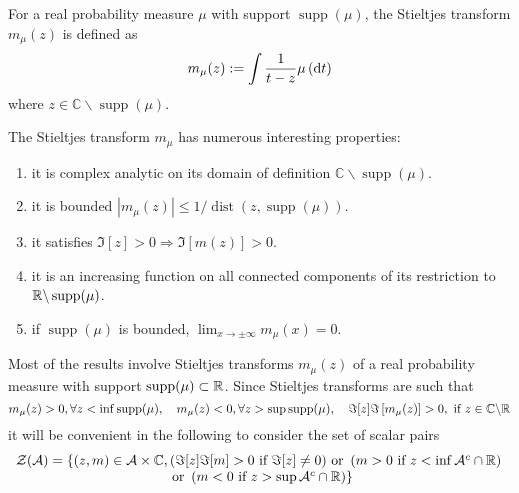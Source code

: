 \begin{definition}
	For a real probability measure \(\mu\) with support \(\operatorname{supp}(\mu)\), the Stieltjes transform \(m_{\mu}(z)\) is defined as
	\begin{equation}
		m_{\mu}(z):=\int\frac{1}{t-z}\mu\left(\mathop{}\!\mathrm{d} t\right)
	\end{equation}
	where \(z\in\mathbb{C}\backslash\operatorname{supp}(\mu)\).
\end{definition}

\begin{property}
	The Stieltjes transform \(m_{\mu}\) has numerous interesting properties:
	\begin{enumerate}
		\item it is complex analytic on its domain of definition \(\mathbb{C} \backslash \operatorname{supp}(\mu)\).
		\item it is bounded \(\left|m_{\mu}(z)\right|\leq 1/\operatorname{dist}(z,\operatorname{supp}(\mu))\).
		\item it satisfies \(\Im[z]>0 \Rightarrow \Im[m(z)]>0\).
		\item it is an increasing function on all connected components of its restriction to \(\mathbb{R}\backslash\operatorname{supp}(\mu)\). %
		\item if \(\operatorname{supp}(\mu)\) is bounded, \(\lim_{x\rightarrow\pm\infty}m_{\mu}(x)=0\).
	\end{enumerate}
\end{property}

\begin{remark}
	Most of the results involve Stieltjes transforms \(m_{\mu}(z)\) of a real probability measure with support \(\operatorname{supp}(\mu) \subset \mathbb{R}\). Since Stieltjes transforms are such that
	\begin{equation*}
		m_{\mu}(z)>0,\forall z<\inf\operatorname{supp}(\mu),\quad m_{\mu}(z)<0,\forall z>\sup \operatorname{supp}(\mu),\quad\Im[z] \Im\left[m_{\mu}(z)\right]>0,\ \text{if}\ z\in\mathbb{C}\backslash\bbR
	\end{equation*}
	it will be convenient in the following to consider the set of scalar pairs
	\begin{equation*}
		\begin{array}{c}
			\mathcal{Z}(\mathcal{A})=\left\{(z,m)\in\mathcal{A}\times\mathbb{C},(\Im[z]\Im[m]>0\text{ if } \Im[z] \neq 0)\ \text{or}\ \left(m>0\text{ if }z<\inf \mathcal{A}^{c} \cap \mathbb{R}\right)\right. \\
			\left.\ \text{or}\ \left(m<0\text{ if }z>\sup \mathcal{A}^{c} \cap \mathbb{R}\right)\right\}
		\end{array}
	\end{equation*}
\end{remark}

